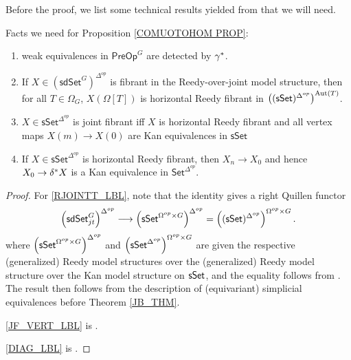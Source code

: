 \documentclass[a4paper,10pt
,draft
]{article}%
\renewcommand{\1}{\eta}%
\begin{document}
Before the proof, we list some technical results yielded from \cite{BP_edss} that we will need.
\begin{lemma}
      \label{COMUOTOHOM_FACTS}
      Facts we need for Proposition \ref{COMUOTOHOM PROP}:
      \begin{enumerate}[label = (\roman*)]
      \item weak equivalences in $\mathsf{PreOp}^G$ are detected by $\gamma^{\**}$.
      \item \label{RJOINTT_LBL} If $X \in (\mathsf{sdSet}^G)^{\Delta^{op}}$ is fibrant in the Reedy-over-joint model structure,
            then for all $T \in \Omega_G$, $X(\Omega[T])$ is horizontal Reedy fibrant in
            $\left((\mathsf{sSet})^{\Delta^{op}}\right)^{\operatorname{Aut}(T)}$.
      \item \label{JF_VERT_LBL}
            $X \in \mathsf{sSet}^{\Delta^{op}}$ is joint fibrant iff
            $X$ is horizontal Reedy fibrant and all vertex maps $X(m) \to X(0)$ are Kan equivalences in $\mathsf{sSet}$
      \item \label{DIAG_LBL}
             If $X \in \mathsf{sSet}^{\Delta^{op}}$ is horizontal Reedy fibrant, then
             $X_n \to X_0$ and hence $X_0 \to \delta^{\**}X$ is a Kan equivalence in $\mathsf{Set}^{\Delta^{op}}$.
      \end{enumerate}
\end{lemma}
\begin{proof}
      For \ref{RJOINTT_LBL},
      note that the identity gives a right Quillen functor
      \[
            \left( \mathsf{sdSet}_{jt}^G \right)^{\Delta^{op}} \longrightarrow
            \left(\mathsf{sSet}^{\Omega^{op} \times G}\right)^{\Delta^{op}} =
            \left( (\mathsf{sSet})^{\Delta^{op}} \right)^{\Omega^{op} \times G}.
      \]
      where $\left(\mathsf{sSet}^{\Omega^{op} \times G}\right)^{\Delta^{op}}$ and $\left(\mathsf{sSet}^{\Delta^{op}}\right)^{\Omega^{op} \times G}$
      are given the respective (generalized) Reedy model structures over the (generalized) Reedy model structure
      over the Kan model structure on $\mathsf{sSet}$,
      and the equality follows from \cite[Remark A.31]{BP_edss}.
      The result then follows from the description of (equivariant) simplicial equivalences before Theorem \ref{JB_THM}.
      
      \ref{JF_VERT_LBL} is \cite[Prop. 4.24(ii)]{BP_edss}.

      \ref{DIAG_LBL} is \cite[Prop. 4.5(iv)]{BP_edss}.
\end{proof}
\end{document}
